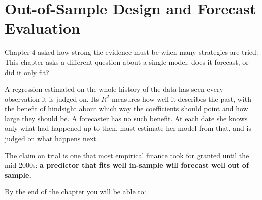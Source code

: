 \makeatletter
{}
\makeatother

\chapter{Out-of-Sample Design and Forecast Evaluation}
\label{ch:05}

Chapter 4 asked how strong the evidence must be when many strategies are tried. This chapter asks a different question about a single model: does it forecast, or did it only fit?

A regression estimated on the whole history of the data has seen every observation it is judged on. Its $R^2$ measures how well it describes the past, with the benefit of hindsight about which way the coefficients should point and how large they should be. A forecaster has no such benefit. At each date she knows only what had happened up to then, must estimate her model from that, and is judged on what happens next.

The claim on trial is one that most empirical finance took for granted until the mid-2000s: \textbf{a predictor that fits well in-sample will forecast well out of sample.}

By the end of the chapter you will be able to:

